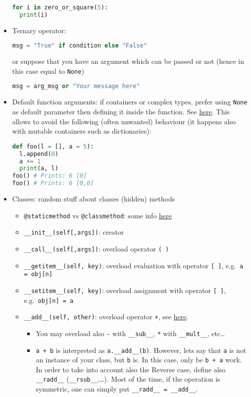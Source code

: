 \documentclass[a4paper,12pt,%
              final%
              ]{article}
\begin{document}
\begin{itemize}
\begin{lstlisting}[language=python]
for i in zero_or_square(5):
  print(i)
\end{lstlisting}
  \item Ternary operator:
\begin{lstlisting}[language=python]
msg = "True" if condition else "False"
\end{lstlisting}
    or suppose that you have an argument which can be passed or not (hence in this case equal to \verb|None|)
\begin{lstlisting}[language=python]
msg = arg_msg or "Your message here"
\end{lstlisting}
  \item Default function arguments: if containers or complex types, prefer using \verb|None| as default parameter then defining it inside the function. See \href{https://www.geeksforgeeks.org/default-arguments-in-python/}{here}. This allows to avoid the following (often unwanted) behaviour (it happens also with mutable containers such as dictionaries):
\begin{lstlisting}[language=python]
def foo(l = [], a = 5):
  l.append(0)
  a += 1
  print(a, l)
foo() # Prints: 6 [0]
foo() # Prints: 6 [0,0]
\end{lstlisting}
  \item Classes: random stuff about classes (hidden) methods
    \begin{itemize}
      \item \verb|@staticmethod| vs \verb|@classmethod|: some info \href{https://www.geeksforgeeks.org/class-method-vs-static-method-python/}{here}
      \item \verb|__init__(self[,args])|: creator
      \item \verb|__call__(self[,args])|: overload operator \verb|( )|
      \item \verb|__getitem__(self, key)|: overload evaluation with operator \verb|[ ]|, e.g.~\verb|a = obj[n]|
      \item \verb|__setitem__(self, key)|: overload assignment with operator \verb|[ ]|, e.g.~\verb|obj[n] = a|
      \item \verb|__add__(self, other)|: overload operator \verb|+|, see \href{https://docs.python.org/3/reference/datamodel.html#emulating-numeric-types}{here}.
        \begin{itemize}
          \item You may overload also \verb|-| with \verb|__sub__|, \texttt{*} with \verb|__mult__|, etc\ldots
          \item \verb|a + b| is interpreted as \verb|a.__add__(b)|. However, lets say that \texttt{a} is not an instance of your class, but \verb|b| is. In this case, only be \verb|b + a| work. In order to take into account also the Reverse case, define also \verb|__radd__| (\verb|__rsub__|,\ldots). Most of the time, if the operation is symmetric, one can simply put \verb|__radd__ = __add__|.

\end{itemize}
\end{itemize}
\end{itemize}
\end{document}
